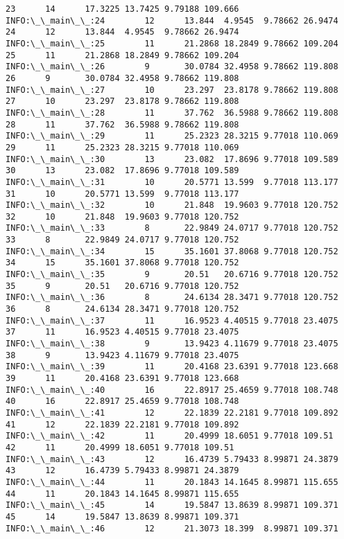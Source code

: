 \documentclass[11pt]{article}
\begin{document}
\begin{Verbatim}[commandchars=\\\{\}]
23      14      17.3225 13.7425 9.79188 109.666
INFO:\_\_main\_\_:24        12      13.844  4.9545  9.78662 26.9474
24      12      13.844  4.9545  9.78662 26.9474
INFO:\_\_main\_\_:25        11      21.2868 18.2849 9.78662 109.204
25      11      21.2868 18.2849 9.78662 109.204
INFO:\_\_main\_\_:26        9       30.0784 32.4958 9.78662 119.808
26      9       30.0784 32.4958 9.78662 119.808
INFO:\_\_main\_\_:27        10      23.297  23.8178 9.78662 119.808
27      10      23.297  23.8178 9.78662 119.808
INFO:\_\_main\_\_:28        11      37.762  36.5988 9.78662 119.808
28      11      37.762  36.5988 9.78662 119.808
INFO:\_\_main\_\_:29        11      25.2323 28.3215 9.77018 110.069
29      11      25.2323 28.3215 9.77018 110.069
INFO:\_\_main\_\_:30        13      23.082  17.8696 9.77018 109.589
30      13      23.082  17.8696 9.77018 109.589
INFO:\_\_main\_\_:31        10      20.5771 13.599  9.77018 113.177
31      10      20.5771 13.599  9.77018 113.177
INFO:\_\_main\_\_:32        10      21.848  19.9603 9.77018 120.752
32      10      21.848  19.9603 9.77018 120.752
INFO:\_\_main\_\_:33        8       22.9849 24.0717 9.77018 120.752
33      8       22.9849 24.0717 9.77018 120.752
INFO:\_\_main\_\_:34        15      35.1601 37.8068 9.77018 120.752
34      15      35.1601 37.8068 9.77018 120.752
INFO:\_\_main\_\_:35        9       20.51   20.6716 9.77018 120.752
35      9       20.51   20.6716 9.77018 120.752
INFO:\_\_main\_\_:36        8       24.6134 28.3471 9.77018 120.752
36      8       24.6134 28.3471 9.77018 120.752
INFO:\_\_main\_\_:37        11      16.9523 4.40515 9.77018 23.4075
37      11      16.9523 4.40515 9.77018 23.4075
INFO:\_\_main\_\_:38        9       13.9423 4.11679 9.77018 23.4075
38      9       13.9423 4.11679 9.77018 23.4075
INFO:\_\_main\_\_:39        11      20.4168 23.6391 9.77018 123.668
39      11      20.4168 23.6391 9.77018 123.668
INFO:\_\_main\_\_:40        16      22.8917 25.4659 9.77018 108.748
40      16      22.8917 25.4659 9.77018 108.748
INFO:\_\_main\_\_:41        12      22.1839 22.2181 9.77018 109.892
41      12      22.1839 22.2181 9.77018 109.892
INFO:\_\_main\_\_:42        11      20.4999 18.6051 9.77018 109.51
42      11      20.4999 18.6051 9.77018 109.51
INFO:\_\_main\_\_:43        12      16.4739 5.79433 8.99871 24.3879
43      12      16.4739 5.79433 8.99871 24.3879
INFO:\_\_main\_\_:44        11      20.1843 14.1645 8.99871 115.655
44      11      20.1843 14.1645 8.99871 115.655
INFO:\_\_main\_\_:45        14      19.5847 13.8639 8.99871 109.371
45      14      19.5847 13.8639 8.99871 109.371
INFO:\_\_main\_\_:46        12      21.3073 18.399  8.99871 109.371

\end{Verbatim}
\end{document}
